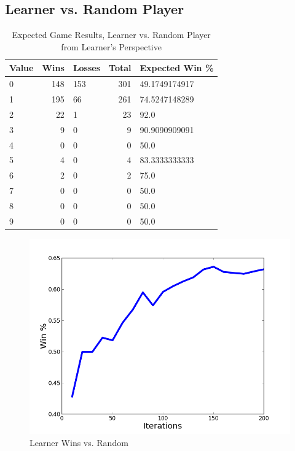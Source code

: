 \documentclass[12pt,pdftex]{article}
\begin{document}
\subsection{Learner vs. Random Player}
\begin{table}[hb!]
\centering
\begin{tabular}{| l | r | l | r | l |}
	\hline
 \textbf{Value} & \textbf{Wins}& \textbf{Losses}& \textbf{Total}& \textbf{Expected Win \%}\\
\hline
0& 148& 153& 301& 49.1749174917\\
1& 195& 66& 261& 74.5247148289\\
2& 22& 1& 23& 92.0\\
3& 9& 0& 9& 90.9090909091\\
4& 0& 0& 0& 50.0\\
5& 4& 0& 4& 83.3333333333\\
6& 2& 0& 2& 75.0\\
7& 0& 0& 0& 50.0\\
8& 0& 0& 0& 50.0\\
9& 0& 0& 0& 50.0\\
\hline
\end{tabular}
\caption{Expected Game Results, Learner vs. Random Player from Learner's Perspective}
\label{tab:learner_v_rand}
\end{table}
\begin{figure}[ht!]
	\begin{center}
		\includegraphics[scale=0.5]{figs/learnervrand.png}
		\caption{Learner Wins vs. Random}
		\label{fig:learner_v_rand}
\end{center}
\end{figure}
\end{document}
